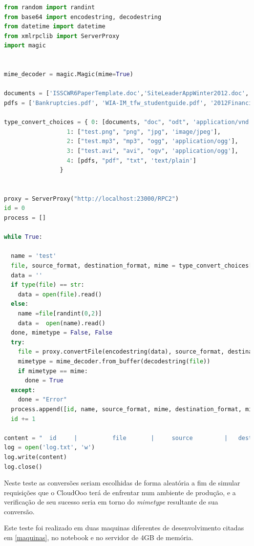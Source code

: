 \newpage
{\singlespace
\begin{lstlisting}[caption=\textit{Script} de teste,language=python,label=carga]
from random import randint
from base64 import encodestring, decodestring
from datetime import datetime
from xmlrpclib import ServerProxy
import magic


mime_decoder = magic.Magic(mime=True)

documents = ['ISSCWR6PaperTemplate.doc','SiteLeaderAppWinter2012.doc', 'Estonia.doc']
pdfs = ['Bankruptcies.pdf', 'WIA-IM_tfw_studentguide.pdf', '2012FinancialRpt.pdf']

type_convert_choices = { 0: [documents, "doc", "odt", 'application/vnd.oasis.opendocument.text'],
                  1: ["test.png", "png", "jpg", 'image/jpeg'],
                  2: ["test.mp3", "mp3", "ogg", 'application/ogg'],
                  3: ["test.avi", "avi", "ogv", 'application/ogg'],
                  4: [pdfs, "pdf", "txt", 'text/plain']
                }


proxy = ServerProxy("http://localhost:23000/RPC2")
id = 0
process = []

while True:

  name = 'test'
  file, source_format, destination_format, mime = type_convert_choices[randint(0,4)]
  data = ''
  if type(file) == str: 
    data = open(file).read()
  else:
    name =file[randint(0,2)]
    data =  open(name).read()
  done, mimetype = False, False
  try:
    file = proxy.convertFile(encodestring(data), source_format, destination_format)
    mimetype = mime_decoder.from_buffer(decodestring(file))
    if mimetype == mime:
      done = True
  except:
    done = "Error"
  process.append([id, name, source_format, mime, destination_format, mimetype, done, '\n'])
  id += 1

content = "  id     |          file       |     source         |   dest            |    done          \n" + str(process)
log = open('log.txt', 'w')
log.write(content)
log.close()

\end{lstlisting}
}

Neste teste as conversões seriam escolhidas de forma aleatória a fim de simular requisições que o CloudOoo terá de enfrentar num ambiente de produção, e a verificação de seu sucesso seria em torno do \textit{mimetype} resultante de sua conversão.

Este teste foi realizado em duas maquinas diferentes de desenvolvimento citadas em \ref{maquinas}, no notebook e no servidor de 4GB de memória.

